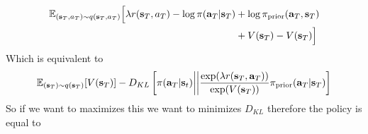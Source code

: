 \begin{equation}
    \begin{aligned}
        \begin{aligned}
            \mathbb{E}_{(\bold{s}_T, a_T) \sim q(\bold{s}_T, a_T)} \Big[ \lambda r(\bold{s}_T, a_T) - \log \pi(\bold{a}_T|\bold{s}_T) &+ \log \pi_{\text{prior}} (\bold{a}_T, \bold{s}_T) \\
            &+ V(\bold{s}_T) - V(\bold{s}_T)\Big]
        \end{aligned} \\
    \end{aligned}
\end{equation}
Which is equivalent to 
\begin{equation}
    \mathbb{E}_{(\bold{s}_T) \sim q(\bold{s}_T)}[V(\bold{s}_T)] - D_{KL} \left[ \pi(\bold{a}_T | \bold{s}_t) \bigg|\bigg|  \frac{\exp(\lambda r(\bold{s}_T, \bold{a}_T))}{\exp( V(\bold{s}_T))} \pi_{\text{prior}}(\bold{a}_T | \bold{s}_T) \right]
\end{equation}
So if we want to maximizes this we want to minimizes $D_{KL}$ therefore the policy is equal to 

